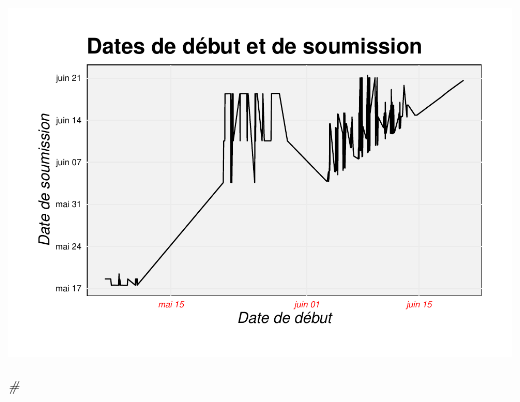 \documentclass[
]{article}
\newenvironment{Shaded}{\begin{snugshade}}{\end{snugshade}}
\newcommand{\CommentTok}[1]{\textcolor[rgb]{0.56,0.35,0.01}{\textit{#1}}}
\begin{document}
\includegraphics{PROJET_files/figure-latex/unnamed-chunk-14-1.pdf}

\begin{Shaded}
\begin{Highlighting}[]
\CommentTok{\#}
\end{Highlighting}
\end{Shaded}

\newpage
\end{document}
